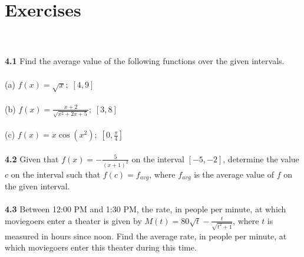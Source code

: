 \documentclass[11pt]{scrartcl}
\begin{document}
\section{Exercises}\\
\\
\noindent 
\textbf{4.1} Find the average value of the following functions over the given intervals. \\
\\
\noindent
(a) $f(x)=\sqrt{x} ; \;[4,9]$\\
\\
\noindent 
(b) $f(x)=\frac{x+2}{\sqrt{x^2+2x+5}} ; \; [3,8]$\\
\\
\noindent 
(c) $f(x)=x\cos (x^2) ; \; [0, \frac{\pi}{4}]$\\
\\
\noindent 
\textbf{4.2} Given that $f(x)=-\frac{5}{(x+1)^2}$ on the interval $[-5,-2]$, determine the value $c$ on the interval such that $f(c)=f_{avg}$, where $f_{avg}$ is the average value of $f$ on the given interval. \\
\\
\noindent 
\textbf{4.3} Between 12:00 PM and 1:30 PM, the rate, in people per minute, at which moviegoers enter a theater is given by $M(t)=80\sqrt{t}-\frac{t}{\sqrt{t^2+1}}$, where $t$ is measured in hours since noon. Find the average rate, in people per minute, at which moviegoers enter this theater during this time.\\
\\ \noindent 
\end{document}
